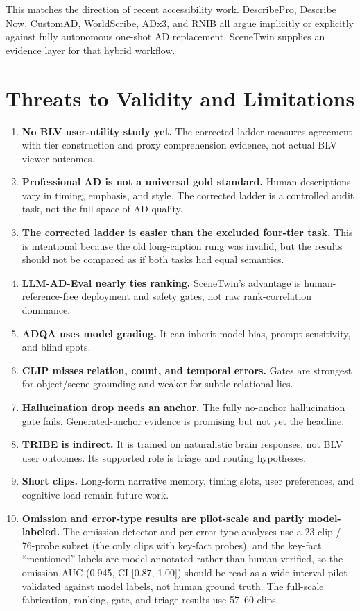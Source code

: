 \documentclass[10pt,twocolumn]{article}
\begin{document}
This matches the direction of recent accessibility work. DescribePro, Describe Now, CustomAD, WorldScribe, ADx3, and RNIB all argue implicitly or explicitly against fully autonomous one-shot AD replacement. SceneTwin supplies an evidence layer for that hybrid workflow.


\section{Threats to Validity and Limitations}


\begin{enumerate}[leftmargin=*]
\item \textbf{No BLV user-utility study yet.} The corrected ladder measures agreement with tier construction and proxy comprehension evidence, not actual BLV viewer outcomes.
\item \textbf{Professional AD is not a universal gold standard.} Human descriptions vary in timing, emphasis, and style. The corrected ladder is a controlled audit task, not the full space of AD quality.
\item \textbf{The corrected ladder is easier than the excluded four-tier task.} This is intentional because the old long-caption rung was invalid, but the results should not be compared as if both tasks had equal semantics.
\item \textbf{LLM-AD-Eval nearly ties ranking.} SceneTwin's advantage is human-reference-free deployment and safety gates, not raw rank-correlation dominance.
\item \textbf{ADQA uses model grading.} It can inherit model bias, prompt sensitivity, and blind spots.
\item \textbf{CLIP misses relation, count, and temporal errors.} Gates are strongest for object/scene grounding and weaker for subtle relational lies.
\item \textbf{Hallucination drop needs an anchor.} The fully no-anchor hallucination gate fails. Generated-anchor evidence is promising but not yet the headline.
\item \textbf{TRIBE is indirect.} It is trained on naturalistic brain responses, not BLV user outcomes. Its supported role is triage and routing hypotheses.
\item \textbf{Short clips.} Long-form narrative memory, timing slots, user preferences, and cognitive load remain future work.
\item \textbf{Omission and error-type results are pilot-scale and partly model-labeled.} The omission detector and per-error-type analyses use a 23-clip / 76-probe subset (the only clips with key-fact probes), and the key-fact ``mentioned'' labels are model-annotated rather than human-verified, so the omission AUC (0.945, CI [0.87, 1.00]) should be read as a wide-interval pilot validated against model labels, not human ground truth. The full-scale fabrication, ranking, gate, and triage results use 57--60 clips.

\end{enumerate}
\end{document}
